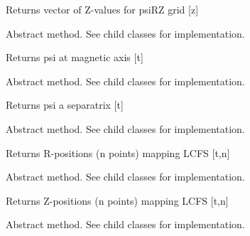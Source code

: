 \documentclass[letterpaper,10pt,english]{sphinxmanual}
\begin{document}
\begin{fulllineitems}
\begin{fulllineitems}
Returns vector of Z-values for psiRZ grid {[}z{]}

\end{fulllineitems}


\begin{fulllineitems}
\label{eqtools:eqtools.core.Equilibrium.getFluxAxis}
Abstract method.  See child classes for implementation.

Returns psi at magnetic axis {[}t{]}

\end{fulllineitems}


\begin{fulllineitems}
\label{eqtools:eqtools.core.Equilibrium.getFluxLCFS}
Abstract method.  See child classes for implementation.

Returns psi a separatrix {[}t{]}

\end{fulllineitems}


\begin{fulllineitems}
\label{eqtools:eqtools.core.Equilibrium.getRLCFS}
Abstract method.  See child classes for implementation.

Returns R-positions (n points) mapping LCFS {[}t,n{]}

\end{fulllineitems}


\begin{fulllineitems}
\label{eqtools:eqtools.core.Equilibrium.getZLCFS}
Abstract method.  See child classes for implementation.

Returns Z-positions (n points) mapping LCFS {[}t,n{]}

\end{fulllineitems}


\begin{fulllineitems}
\label{eqtools:eqtools.core.Equilibrium.remapLCFS}
Abstract method.  See child classes for implementation.


\end{fulllineitems}
\end{fulllineitems}
\end{document}
